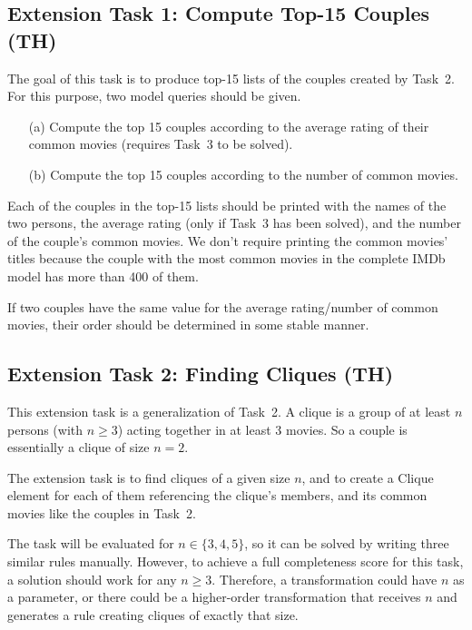 \documentclass[a4paper,11pt]{article}
\newcommand{\p}[1]{\textsf{\small #1}}
\begin{document}
\subsection{Extension Task 1: Compute Top-15 Couples (TH)}

The goal of this task is to produce top-15 lists of the couples created by
Task~2.  For this purpose, two model queries should be given.

\begin{enumerate}
\item[(a)] Compute the top 15 couples according to the average rating of
  their common movies (requires Task~3 to be solved).
\item[(b)] Compute the top 15 couples according to the number of common movies.
\end{enumerate}

Each of the couples in the top-15 lists should be printed with the names of the
two persons, the average rating (only if Task~3 has been solved), and the
number of the couple's common movies.  We don't require printing the common
movies' titles because the couple with the most common movies in the complete
IMDb model has more than 400 of them.

If two couples have the same value for the average rating/number of common
movies, their order should be determined in some stable manner.

\subsection{Extension Task 2: Finding Cliques (TH)}

This extension task is a generalization of Task~2.  A clique is a group of at
least \(n\) persons (with \(n \geq 3\)) acting together in at least 3 movies.
So a couple is essentially a clique of size \(n = 2\).

The extension task is to find cliques of a given size \(n\), and to create a
\p{Clique} element for each of them referencing the clique's members, and
its common movies like the couples in Task~2.

The task will be evaluated for \(n \in \{3, 4, 5\}\), so it can be solved by
writing three similar rules manually.  However, to achieve a full completeness
score for this task, a solution should work for any \(n \geq 3\).  Therefore, a
transformation could have \(n\) as a parameter, or there could be a
higher-order transformation that receives \(n\) and generates a rule creating
cliques of exactly that size.
\end{document}
